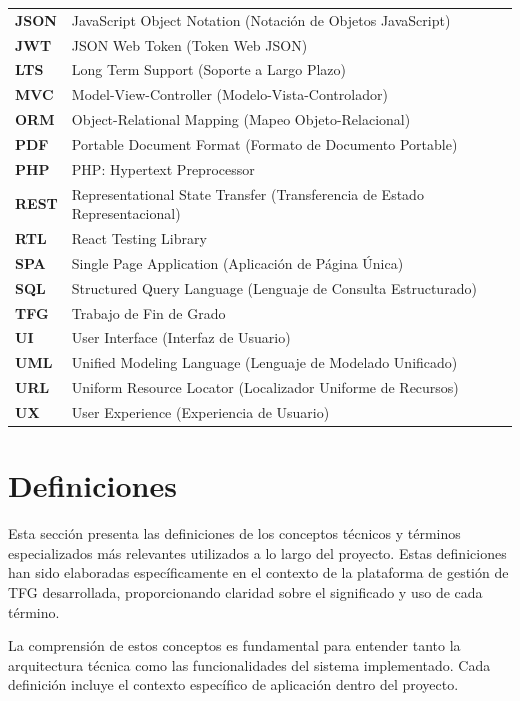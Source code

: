 \documentclass[12pt,a4paper,oneside]{report}
\begin{document}
\begin{longtable}[]{@{}
  >{\raggedright\arraybackslash}p{}
  >{\raggedright\arraybackslash}p{}@{}}
\textbf{JSON} & JavaScript Object Notation (Notación de Objetos
JavaScript) \\
\textbf{JWT} & JSON Web Token (Token Web JSON) \\
\textbf{LTS} & Long Term Support (Soporte a Largo Plazo) \\
\textbf{MVC} & Model-View-Controller (Modelo-Vista-Controlador) \\
\textbf{ORM} & Object-Relational Mapping (Mapeo Objeto-Relacional) \\
\textbf{PDF} & Portable Document Format (Formato de Documento
Portable) \\
\textbf{PHP} & PHP: Hypertext Preprocessor \\
\textbf{REST} & Representational State Transfer (Transferencia de Estado
Representacional) \\
\textbf{RTL} & React Testing Library \\
\textbf{SPA} & Single Page Application (Aplicación de Página Única) \\
\textbf{SQL} & Structured Query Language (Lenguaje de Consulta
Estructurado) \\
\textbf{TFG} & Trabajo de Fin de Grado \\
\textbf{UI} & User Interface (Interfaz de Usuario) \\
\textbf{UML} & Unified Modeling Language (Lenguaje de Modelado
Unificado) \\
\textbf{URL} & Uniform Resource Locator (Localizador Uniforme de
Recursos) \\
\textbf{UX} & User Experience (Experiencia de Usuario) \\
\end{longtable}

\section{Definiciones}\label{definiciones}

Esta sección presenta las definiciones de los conceptos técnicos y
términos especializados más relevantes utilizados a lo largo del
proyecto. Estas definiciones han sido elaboradas específicamente en el
contexto de la plataforma de gestión de TFG desarrollada, proporcionando
claridad sobre el significado y uso de cada término.

La comprensión de estos conceptos es fundamental para entender tanto la
arquitectura técnica como las funcionalidades del sistema implementado.
Cada definición incluye el contexto específico de aplicación dentro del
proyecto.
\end{document}
